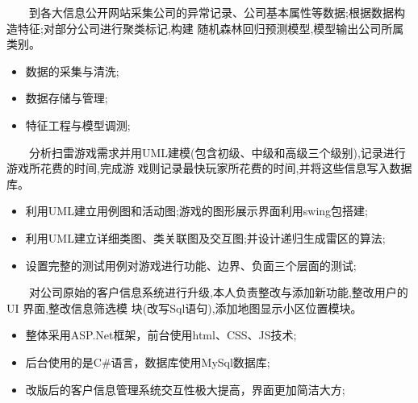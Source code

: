 \documentclass{resume}
\begin{document}
{\ \ \ \ 到各大信息公开网站采集公司的异常记录、公司基本属性等数据;根据数据构造特征;对部分公司进行聚类标记,构建
随机森林回归预测模型,模型输出公司所属类别。}
\begin{itemize}
  \item 数据的采集与清洗;
  \item 数据存储与管理;
  \item 特征工程与模型调测;
\end{itemize}
\medskip


{\ \ \ \ 分析扫雷游戏需求并用UML建模(包含初级、中级和高级三个级别),记录进行游戏所花费的时间,完成游
戏则记录最快玩家所花费的时间,并将这些信息写入数据库。}
\begin{itemize}
  \item 利用UML建立用例图和活动图;游戏的图形展示界面利用swing包搭建;
  \item 利用UML建立详细类图、类关联图及交互图;并设计递归生成雷区的算法;
  \item 设置完整的测试用例对游戏进行功能、边界、负面三个层面的测试;
\end{itemize}
\medskip


{\ \ \ \ 对公司原始的客户信息系统进行升级,本人负责整改与添加新功能,整改用户的UI 界面,整改信息筛选模
块(改写Sql语句),添加地图显示小区位置模块。}
\begin{itemize}
  \item 整体采用ASP.Net框架，前台使用html、CSS、JS技术;
  \item 后台使用的是C\#语言，数据库使用MySql数据库;
  \item 改版后的客户信息管理系统交互性极大提高，界面更加简洁大方;
\end{itemize}
\medskip

\end{document}

